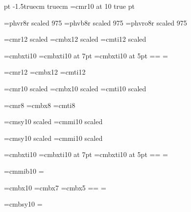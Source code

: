 
 pt
\magnification\magstephalf
\overfullrule 0pt
\voffset -1.5truecm
 truecm
\def\gsim{\raise.3ex\hbox{$\;>$\kern-.75em\lower1ex\hbox{$\sim$}$\;$}}
\def\P{I\!\!P}
\font\rfont=cmr10 at 10 true pt
\def\ref#1{$^{\hbox{\rfont {[#1]}}}$}

\font\helv=phvr8r scaled 975
\font\bold=phvb8r scaled 975
\font\oblique=phvro8r scaled 975

\font\fourteenrm=cmr12 scaled
\font\fourteenbf=cmbx12 scaled
\font\fourteenit=cmti12 scaled

\font\tenbfit=cmbxti10
\font\sevenbfit=cmbxti10 at 7pt
\font\fivebfit=cmbxti10 at 5pt
\newfam\bfitfam \def\bfit{\fam\bfitfam\tenbfit}
\textfont\bfitfam=\tenbfit  \scriptfont\bfitfam=\sevenbfit
\scriptscriptfont\bfitfam=\fivebfit

\font\twelverm=cmr12
\font\twelvebf=cmbx12
\font\twelveit=cmti12

\font\tenrm=cmr10 scaled
\font\tenbf=cmbx10 scaled
\font\tenit=cmti10 scaled

\font\eightrm=cmr8
\font\eightbf=cmbx8
\font\eightit=cmti8

\font\twelvesy=cmsy10 scaled
\font\twelvemit=cmmi10 scaled
\def\bigmath{\textfont2=\twelvesy
             \textfont1=\twelvemit
             \twelvebf}

\font\fourteensy=cmsy10 scaled
\font\fourteenmit=cmmi10 scaled
\def\Bigmath{\textfont2=\fourteensy
             \textfont1=\fourteenmit
             \fourteenbf}


\font\tenbfit=cmbxti10
\font\sevenbfit=cmbxti10 at 7pt
\font\fivebfit=cmbxti10 at 5pt
\newfam\bfitfam \def\bfit{\fam\bfitfam\tenbfit}
\textfont\bfitfam=\tenbfit  \scriptfont\bfitfam=\sevenbfit
\scriptscriptfont\bfitfam=\fivebfit

\font\tenbit=cmmib10
\newfam\bitfam
\textfont\bitfam=\tenbit%

\font\tenmbf=cmbx10
\font\sevenmbf=cmbx7
\font\fivembf=cmbx5
\newfam\mbffam
\textfont\mbffam=\tenmbf \scriptfont\mbffam=\sevenmbf
\scriptscriptfont\mbffam=\fivembf

\font\tenbsy=cmbsy10
\newfam\bsyfam \def\bfcal{\fam\bsyfam\tenbsy}
\textfont\bsyfam=\tenbsy%


\def\a {\alpha} \def\b {\beta} \def\g {\gamma} \def \d {\delta}
\def\e{\epsilon} \def \f {\phi} \def\o{\omega}
\def\s {\sigma} \def\t {\theta} \def\la{\lambda}
\def\T {\Theta} \def\L {\Lambda} \def\G {\Gamma}
\def\pd {\partial}
\def\pmb#1{\setbox0=\hbox{#1}%
 \kern.05em\copy0\kern-\wd0 \kern-.025em\raise.0433em\box0 }
\def\bpi{{\pmb{$ \pi$}}}
\def\slash{/\kern-.5em}

